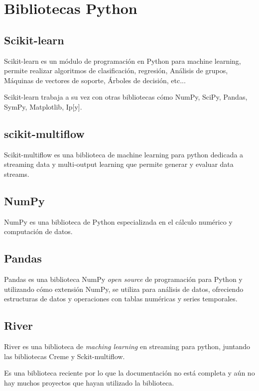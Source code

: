 \section{Bibliotecas Python}

\subsection{Scikit-learn}

Scikit-learn es un módulo de programación en Python para machine learning, permite realizar algoritmos de clasificación, regresión, Análisis de grupos, Máquinas de vectores de soporte, Árboles de decisión, etc...

Scikit-learn trabaja a su vez con otras bibliotecas cómo NumPy, SciPy, Pandas, SymPy, Matplotlib, Ip[y].\cite{pagina:scikit-learn}

\subsection{scikit-multiflow}

Scikit-multiflow es una biblioteca de machine learning para python dedicada a streaming data y multi-output learning que permite generar y evaluar data streams.\cite{skmultiflow}

\subsection{NumPy}
NumPy es una biblioteca de Python especializada en el cálculo numérico y computación de datos. 

\subsection{Pandas}

Pandas es una biblioteca NumPy \textit{open source} de programación para Python y utilizando cómo extensión NumPy, se utiliza para análisis de datos, ofreciendo estructuras de datos y operaciones con tablas numéricas y series temporales.\cite{pagina:wiki_pandas}


\subsection{River}
River es una biblioteca de \textit{maching learning} en streaming para python, juntando las bibliotecas Creme y Sckit-multiflow.

Es una biblioteca reciente por lo que la documentación no está completa y aún no hay muchos proyectos que hayan utilizado la biblioteca.\cite{pagina:River}

